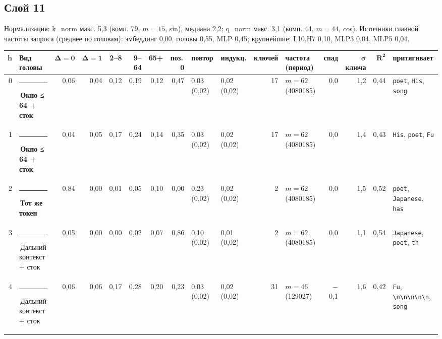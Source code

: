 \documentclass[10pt]{article}
\begin{document}
\noindent\begin{minipage}{\linewidth}
\subsection*{Слой 11}
{\small\color{ink2} Нормализация: k\_norm макс. 5,3 (комп. 79, $m{=}15$, sin), медиана 2,2; q\_norm макс. 3,1 (комп. 44, $m{=}44$, cos). Источники главной частоты запроса (среднее по головам): эмбеддинг 0,00, головы 0,55, MLP 0,45; крупнейшие: L10.H7 0,10, MLP3 0,04, MLP5 0,04.}
\begin{center}{\footnotesize\begin{tabular}{|r|l|r|r|r|r|r|r|l|l|r|l|r|r|r|l|}
\hline
\rowcolor{head}\textbf{h} & \textbf{Вид головы} & $\boldsymbol{\Delta{=}0}$ & $\boldsymbol{\Delta{=}1}$ & \textbf{2–8} & \textbf{9–64} & \textbf{65+} & \textbf{поз.\,0} & \textbf{повтор} & \textbf{индукц.} & \textbf{ключей} & \textbf{частота (период)} & \textbf{спад} & $\boldsymbol{\sigma}$ \textbf{ключа} & $\boldsymbol{R^2}$ & \textbf{притягивает} \\ \hline
0 & \textcolor[HTML]{EDA100}{\rule{0.62em}{0.62em}}\,\textbf{Окно ≤ 64 + сток} & 0,06 & 0,04 & 0,12 & 0,19 & 0,12 & 0,47 & 0,03 (0,02) & 0,02 (0,02) & 17 & $m{=}62$ (4080185) & 0,0 & 1,2 & 0,44 & \texttt{\textvisiblespace{}poet}, \texttt{\textvisiblespace{}His}, \texttt{\textvisiblespace{}song} \\ \hline
1 & \textcolor[HTML]{EDA100}{\rule{0.62em}{0.62em}}\,\textbf{Окно ≤ 64 + сток} & 0,04 & 0,05 & 0,17 & 0,24 & 0,14 & 0,35 & 0,03 (0,02) & 0,02 (0,02) & 17 & $m{=}62$ (4080185) & 0,0 & 1,4 & 0,43 & \texttt{\textvisiblespace{}His}, \texttt{\textvisiblespace{}poet}, \texttt{\textvisiblespace{}Fu} \\ \hline
2 & \textcolor[HTML]{E87BA4}{\rule{0.62em}{0.62em}}\,\textbf{Тот же токен} & 0,84 & 0,00 & 0,01 & 0,05 & 0,10 & 0,00 & 0,23 (0,02) & 0,02 (0,02) & 2 & $m{=}62$ (4080185) & 0,0 & 1,5 & 0,52 & \texttt{\textvisiblespace{}poet}, \texttt{\textvisiblespace{}Japanese}, \texttt{\textvisiblespace{}has} \\ \hline
3 & \textcolor[HTML]{C3C2B7}{\rule{0.62em}{0.62em}}\,Дальний контекст + сток & 0,05 & 0,00 & 0,00 & 0,02 & 0,07 & 0,86 & 0,10 (0,02) & 0,01 (0,02) & 2 & $m{=}62$ (4080185) & 0,0 & 1,1 & 0,54 & \texttt{\textvisiblespace{}Japanese}, \texttt{\textvisiblespace{}poet}, \texttt{th} \\ \hline
4 & \textcolor[HTML]{C3C2B7}{\rule{0.62em}{0.62em}}\,Дальний контекст + сток & 0,06 & 0,06 & 0,17 & 0,28 & 0,20 & 0,23 & 0,03 (0,02) & 0,02 (0,02) & 31 & $m{=}46$ (129027) & $-$0,1 & 1,6 & 0,42 & \texttt{\textvisiblespace{}Fu}, \texttt{\textvisiblespace{}\textbackslash{}n\textbackslash{}n\textbackslash{}n\textbackslash{}n\textbackslash{}n}, \texttt{\textvisiblespace{}song} \\ \hline

\end{tabular}}
\end{center}
\end{minipage}
\end{document}
